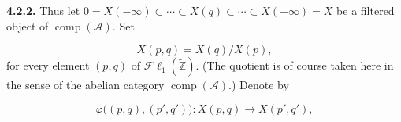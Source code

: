 \medskip\noindent\textbf{4.2.2.}\quad
Thus let
$0=X(-\infty)\subset\cdots\subset X(q)\subset\cdots\subset
X(+\infty)=X$ be a filtered object of $\operatorname{comp}(\mathcal A)$.
Set

\begin{equation}
X(p,q)=X(q)/X(p),
\tag{4.2.2.1}
\end{equation}
for every element $(p,q)$ of
$\mathcal{F}\ell_1(\widetilde{\mathbb Z})$. (The quotient is of course
taken here in the sense of the abelian category
$\operatorname{comp}(\mathcal A)$.) Denote by

\begin{equation}
\varphi\bigl((p,q),(p',q')\bigr)\colon
X(p,q)\longrightarrow X(p',q'),
\tag{4.2.2.2}
\end{equation}
\endgroup
